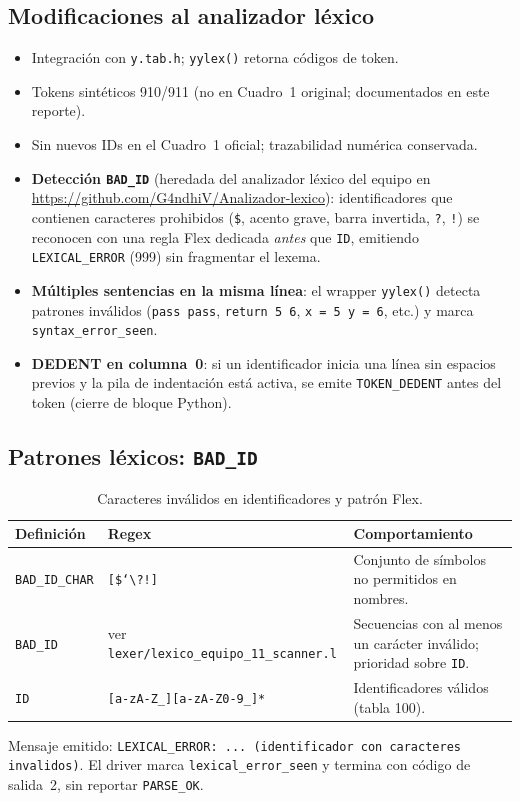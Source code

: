 \subsection{Modificaciones al analizador léxico}
\label{sec:modificaciones_lexer}
\begin{itemize}
  \item Integración con \texttt{y.tab.h}; \texttt{yylex()} retorna códigos de token.
  \item Tokens sintéticos 910/911 (no en Cuadro~1 original; documentados en este reporte).
  \item Sin nuevos IDs en el Cuadro~1 oficial; trazabilidad numérica conservada.
  \item \textbf{Detección \texttt{BAD\_ID}} (heredada del analizador léxico del equipo en \url{https://github.com/G4ndhiV/Analizador-lexico}): identificadores que contienen caracteres prohibidos (\texttt{\$}, acento grave, barra invertida, \texttt{?}, \texttt{!}) se reconocen con una regla Flex dedicada \emph{antes} que \texttt{ID}, emitiendo \texttt{LEXICAL\_ERROR} (999) sin fragmentar el lexema.
  \item \textbf{Múltiples sentencias en la misma línea}: el wrapper \texttt{yylex()} detecta patrones inválidos (\texttt{pass pass}, \texttt{return 5 6}, \texttt{x = 5 y = 6}, etc.) y marca \texttt{syntax\_error\_seen}.
  \item \textbf{DEDENT en columna~0}: si un identificador inicia una línea sin espacios previos y la pila de indentación está activa, se emite \texttt{TOKEN\_DEDENT} antes del token (cierre de bloque Python).
\end{itemize}

\subsection{Patrones léxicos: \texttt{BAD\_ID}}
\begin{table}[H]
\centering
\caption{Caracteres inválidos en identificadores y patrón Flex.}
\label{tab:bad-id}
\begin{tabular}{@{}llp{7.2cm}@{}}
\toprule
\textbf{Definición} & \textbf{Regex} & \textbf{Comportamiento} \\
\midrule
\texttt{BAD\_ID\_CHAR} & \texttt{[\$`{\textbackslash}?!]} & Conjunto de símbolos no permitidos en nombres. \\
\texttt{BAD\_ID} & ver \texttt{lexer/lexico\_equipo\_11\_scanner.l} & Secuencias con al menos un carácter inválido; prioridad sobre \texttt{ID}. \\
\texttt{ID} & \texttt{[a-zA-Z\_][a-zA-Z0-9\_]*} & Identificadores válidos (tabla 100). \\
\bottomrule
\end{tabular}
\end{table}
Mensaje emitido: \texttt{LEXICAL\_ERROR: ... (identificador con caracteres invalidos)}. El driver marca \texttt{lexical\_error\_seen} y termina con código de salida~2, sin reportar \texttt{PARSE\_OK}.

